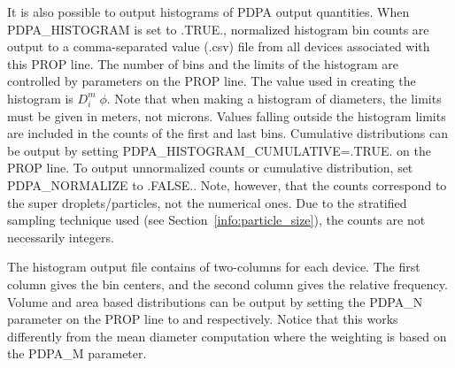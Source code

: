 \documentclass[11pt]{book}
\begin{document}
It is also possible to output histograms of PDPA output quantities. When {\ct PDPA\_HISTOGRAM} is set to {\ct .TRUE.}, normalized histogram bin counts are output to a comma-separated value (.csv) file from all devices associated with this {\ct PROP} line. The number of bins and the limits of the histogram are controlled by parameters on the {\ct PROP} line. The value used in creating the histogram is $D_i^m \; \phi$. Note that when making a histogram of diameters, the limits must be given in meters, not microns. Values falling outside the histogram limits are included in the counts of the first and last bins. Cumulative distributions can be output by setting {\ct PDPA\_HISTOGRAM\_CUMULATIVE=.TRUE.} on the {\ct PROP} line. To output unnormalized counts or cumulative distribution, set {\ct PDPA\_NORMALIZE} to {\ct .FALSE.}. Note, however, that the counts correspond to the super droplets/particles, not the numerical ones. Due to the stratified sampling technique used (see Section~\ref{info:particle_size}), the counts are not necessarily integers.

The histogram output file contains of two-columns for each device. The first column gives the bin centers, and the second column gives the relative frequency. Volume and area based distributions can be output by setting the {\ct PDPA\_N} parameter on the {\ct PROP} line to {} and {} respectively. Notice that this works differently from the mean diameter computation where the weighting is based on the {\ct PDPA\_M} parameter.
\end{document}
